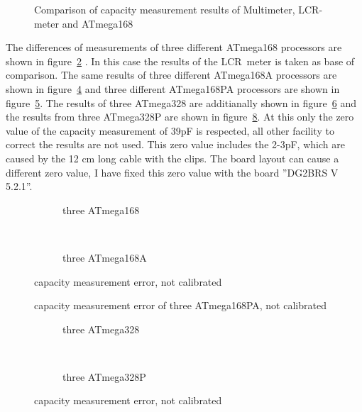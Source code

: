 \begin{figure}[H]
\centering

\caption{Comparison of capacity measurement results of Multimeter, LCR-meter and ATmega168}
\label{fig:capcompare}
\end{figure}

The differences of measurements of three different ATmega168 processors are shown in figure~\ref{fig:mega168all} .
In this case the results of the LCR~meter is taken as base of comparison.
The same results of three different ATmega168A processors are shown in figure~\ref{fig:mega168Aall} and
three different ATmega168PA processors are shown in figure~\ref{fig:mega168PAall}.
The results of three ATmega328 are additianally shown in figure~\ref{fig:mega328all} and the results from three
ATmega328P are shown in figure~\ref{fig:mega328Pall}.
At this only the zero value of the capacity measurement of 39pF is respected, all other facility to correct the results are
not used.
This zero value includes the 2-3pF, which are caused by the 12 cm long cable with the clips.
The board layout can cause a different zero value, I have fixed this zero value with the board ''DG2BRS V 5.2.1''.

\begin{figure}[H]
  \begin{subfigure}[b]{9cm}
    \centering
    \resizebox{9cm}{!}{}
    \caption{three ATmega168}
    \label{fig:mega168all}
  \end{subfigure}
  ~
  \begin{subfigure}[b]{9cm}
    \centering
    \resizebox{9cm}{!}{}
    \caption{three ATmega168A}
    \label{fig:mega168Aall}
  \end{subfigure}
\caption{capacity measurement error, not calibrated}
\end{figure}

\begin{figure}[H]
\centering

\caption{capacity measurement error of three ATmega168PA, not calibrated}
\label{fig:mega168PAall}
\end{figure}

\begin{figure}[H]
  \begin{subfigure}[b]{9cm}
    \centering
    \resizebox{9cm}{!}{}
    \caption{three ATmega328}
    \label{fig:mega328all}
  \end{subfigure}
  ~
  \begin{subfigure}[b]{9cm}
    \centering
    \resizebox{9cm}{!}{}
    \caption{three ATmega328P}
    \label{fig:mega328Pall}
  \end{subfigure}
\caption{capacity measurement error, not calibrated}
\end{figure}

